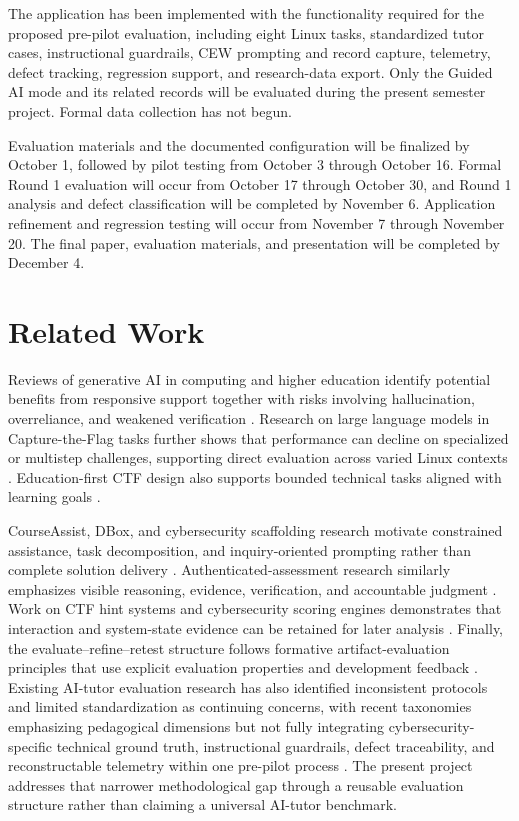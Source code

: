 \documentclass[conference]{IEEEtran}
\begin{document}
The application has been implemented with the functionality required for the proposed pre-pilot evaluation, including eight Linux tasks, standardized tutor cases, instructional guardrails, CEW prompting and record capture, telemetry, defect tracking, regression support, and research-data export. Only the Guided AI mode and its related records will be evaluated during the present semester project. Formal data collection has not begun.

Evaluation materials and the documented configuration will be finalized by October 1, followed by pilot testing from October 3 through October 16. Formal Round 1 evaluation will occur from October 17 through October 30, and Round 1 analysis and defect classification will be completed by November 6. Application refinement and regression testing will occur from November 7 through November 20. The final paper, evaluation materials, and presentation will be completed by December 4.

\section{Related Work}

Reviews of generative AI in computing and higher education identify potential benefits from responsive support together with risks involving hallucination, overreliance, and weakened verification \cite{agbo2025computing,melisa2025critical}. Research on large language models in Capture-the-Flag tasks further shows that performance can decline on specialized or multistep challenges, supporting direct evaluation across varied Linux contexts \cite{zou2024leveraging}. Education-first CTF design also supports bounded technical tasks aligned with learning goals \cite{nelson2024pwn}.

CourseAssist, DBox, and cybersecurity scaffolding research motivate constrained assistance, task decomposition, and inquiry-oriented prompting rather than complete solution delivery \cite{feng2024courseassist,ma2025dbox,xiao2025scaffolding}. Authenticated-assessment research similarly emphasizes visible reasoning, evidence, verification, and accountable judgment \cite{tsiligkiris2026authenticated}. Work on CTF hint systems and cybersecurity scoring engines demonstrates that interaction and system-state evidence can be retained for later analysis \cite{thaqi2024leveraging,morales2025enhancing}. Finally, the evaluate--refine--retest structure follows formative artifact-evaluation principles that use explicit evaluation properties and development feedback \cite{venable2016feds}. Existing AI-tutor evaluation research has also identified inconsistent protocols and limited standardization as continuing concerns, with recent taxonomies emphasizing pedagogical dimensions but not fully integrating cybersecurity-specific technical ground truth, instructional guardrails, defect traceability, and reconstructable telemetry within one pre-pilot process \cite{maurya2025unifying}. The present project addresses that narrower methodological gap through a reusable evaluation structure rather than claiming a universal AI-tutor benchmark.
\end{document}
